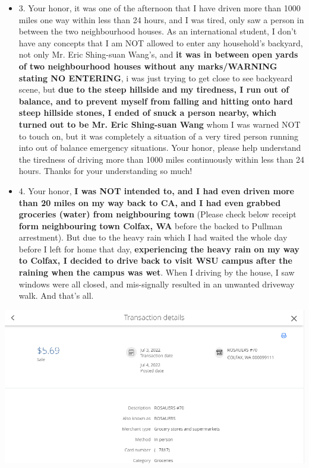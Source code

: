\documentclass[9pt, b5paper]{article}
\begin{document}
\begin{itemize}
\begin{itemize}
\end{itemize}
\item 3. Your honor, it was one of the afternoon that I have driven more than 1000 miles one way within less than 24 hours, and I was tired, only saw a person in between the two neighbourhood houses. As an international student, I don't have any concepts that I am NOT allowed to enter any household's backyard, not only Mr. Eric Shing-suan Wang's, and \textbf{it was in between open yards of two neighbourhood houses without any marks/WARNING stating NO ENTERING}, i was just trying to get close to see backyeard scene, but \textbf{due to the steep hillside and my tiredness, I run out of balance, and to prevent myself from falling and hitting onto hard steep hillside stones, I ended of snuck a person nearby, which turned out to be Mr. Eric Shing-suan Wang} whom I was warned NOT to touch on, but it was completely a situation of a very tired person running into out of balance emergency situations. Your honor, please help understand the tiredness of driving more than 1000 miles continuously within less than 24 hours. Thanks for your understanding so much!
\item 4. Your honor, \textbf{I was NOT intended to, and I had even driven more than 20 miles on my way back to CA, and I had even grabbed groceries (water) from neighbouring town} (Please check below receipt \textbf{form neighbouring town Colfax, WA} before the backed to Pullman arrestment). But due to the heavy rain which I had waited the whole day before I left for home that day, \textbf{experiencing the heavy rain on my way to Colfax, I decided to drive back to visit WSU campus after the raining when the campus was wet}. When I driving by the house, I saw windows were all closed, and mis-signally resulted in an unwanted driveway walk. And that's all.
\end{itemize}

\includegraphics[width=.9\linewidth]{./pic/dearCousin_20220919_201117.png}
\end{document}
